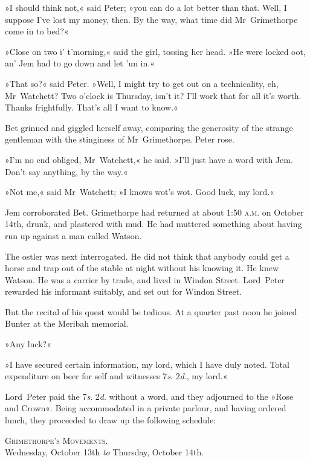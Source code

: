 »I should think not,« said Peter; »you can do a lot better than that. Well, I suppose I've lost my money, then. By the way, what time did Mr~Grimethorpe come in to bed?«

»Close on two i' t'morning,« said the girl, tossing her head. »He were locked oot, an' Jem had to go down and let 'un in.«

»That so?« said Peter. »Well, I might try to get out on a technicality, eh, Mr~Watchett? Two o'clock is Thursday, isn't it? I'll work that for all it's worth. Thanks frightfully. That's all I want to know.«

Bet grinned and giggled herself away, comparing the generosity of the strange gentleman with the stinginess of Mr~Grimethorpe. Peter rose.

»I'm no end obliged, Mr~Watchett,« he said. »I'll just have a word with Jem. Don't say anything, by the way.«

»Not me,« said Mr~Watchett; »I knows wot's wot. Good luck, my lord.«

Jem corroborated Bet. Grimethorpe had returned at about 1:50 \textsc{a.m.} on October 14th, drunk, and plastered with mud. He had muttered something about having run up against a man called Watson.

The ostler was next interrogated. He did not think that anybody could get a horse and trap out of the stable at night without his knowing it. He knew Watson. He was a carrier by trade, and lived in Windon Street. Lord~Peter rewarded his informant suitably, and set out for Windon Street.

But the recital of his quest would be tedious. At a quarter past noon he joined Bunter at the Meribah memorial.

»Any luck?«

»I have secured certain information, my lord, which I have duly noted. Total expenditure on beer for self and witnesses 7\textit{s}. 2\textit{d}., my lord.«

Lord~Peter paid the 7\textit{s}. 2\textit{d}. without a word, and they adjourned to the »Rose and Crown«. Being accommodated in a private parlour, and having ordered lunch, they proceeded to draw up the following schedule:

\makeatletter
{}
{%
\clearpage
}{%

}
\makeatother

\begin{center}
\textsc{Grimethorpe's Movements.}\\Wednesday, October 13th \textit{to} Thursday, October 14th.
\end{center}

